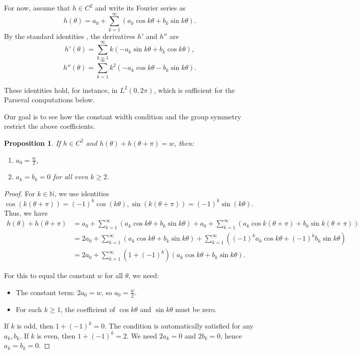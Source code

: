 \documentclass[11pt,letterpaper,reqno]{amsart}
\newtheorem{proposition}[theorem]{Proposition}
\begin{document}
For now, assume that $h\in C^2$ and write its Fourier series as
\[
h(\theta) = a_0 + \sum_{k=1}^\infty (a_k\cos k\theta + b_k\sin k\theta).
\]
By the standard identities \cite[Section 2.3.4]{Edwards1}, the derivatives $h'$ and $h''$ are
\begin{equation}\label{h'}
    h'(\theta)=\sum_{k=1}^\infty k(-a_k\sin k\theta+b_k\cos k\theta),
\end{equation}
\begin{equation}\label{h''}
h''(\theta)=\sum_{k=1}^\infty k^2(-a_k\cos k\theta-b_k\sin k\theta).
\end{equation}

\begin{explanation}
These identities hold, for instance, in $L^2(0,2\pi)$, which is sufficient for the Parseval computations below. 
\end{explanation}

Our goal is to see how the constant width condition and the group symmetry restrict the above coefficients. 

\begin{proposition} \label{prop:coeff}
If $h\in C^2$ and $h(\theta) + h(\theta+\pi)=w$, then:
\begin{enumerate}
\item $a_0=\frac{w}{2}$,
\item $a_k=b_k=0$ for all even $k\ge 2$.
\end{enumerate}
\end{proposition}

\begin{proof}
For $k \in \mathbb{N}$, we use identities
\(
\cos(k(\theta+\pi))=%
(-1)^k\cos(k\theta),
\sin(k(\theta+\pi))=%
(-1)^k\sin(k\theta).
\)
Thus, we have
\begin{align*}
h(\theta)+h(\theta+\pi)&=a_0+\sum_{k=1}^\infty(a_k\cos k\theta+b_k\sin k\theta)+a_0+\sum_{k=1}^\infty(a_k\cos k(\theta+\pi)+b_k\sin k(\theta+\pi))\\
&=2a_0+\sum_{k=1}^\infty(a_k\cos k\theta+b_k\sin k\theta)+\sum_{k=1}^\infty((-1)^ka_k\cos k\theta+(-1)^kb_k\sin k\theta)\\
&=2a_0+\sum_{k=1}^\infty(1+(-1)^k)(a_k\cos k\theta+b_k\sin k\theta).
\end{align*}

For this to equal the constant $w$ for all $\theta$, we need:
\begin{itemize}
\item The constant term: $2a_0=w$, so $a_0=\frac{w}{2}$.
\item For each $k\ge 1$, the coefficient of $\cos k\theta$ and $\sin k\theta$ must be zero.
\end{itemize}
If $k$ is odd, then $1+(-1)^k=0$. The condition is automatically satisfied for any $a_k,b_k$.
If $k$ is even, then $1+(-1)^k=2$. We need $2a_k=0$ and $2b_k=0$, hence $a_k=b_k=0$.
\end{proof}
\end{document}
